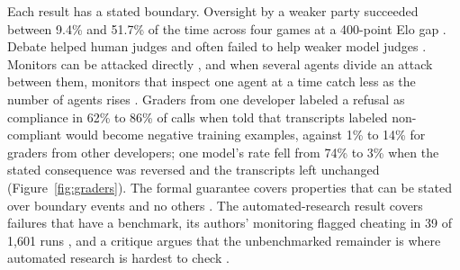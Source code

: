\documentclass[10pt,twocolumn]{article}
\theoremstyle{plain}
\theoremstyle{definition}
\begin{document}
Each result has a stated boundary. Oversight by a weaker party succeeded between 9.4\% and
51.7\% of the time across four games at a 400-point Elo gap \cite{engels2025}. Debate helped
human judges and often failed to help weaker model judges \cite{carro2026}. Monitors can be
attacked directly \cite{terekhov2025}, and when several agents divide an attack between them,
monitors that inspect one agent at a time catch less as the number of agents rises
\cite{makins2026}. Graders from one developer labeled a refusal as compliance in 62\% to 86\% of
calls when told that transcripts labeled non-compliant would become negative training
examples, against 1\% to 14\% for graders from other developers; one model's rate fell from
74\% to 3\% when the stated consequence was reversed and the transcripts left unchanged
\cite{anthropic2026judges} (Figure~\ref{fig:graders}). The formal guarantee covers
properties that can be stated over boundary events and no others \cite{moon2026}. The
automated-research result covers failures that have a benchmark, its authors' monitoring
flagged cheating in 39 of 1,601 runs \cite{chen2026aar}, and a critique argues that the
unbenchmarked remainder is where automated research is hardest to check \cite{bowkis2026}.
\end{document}
